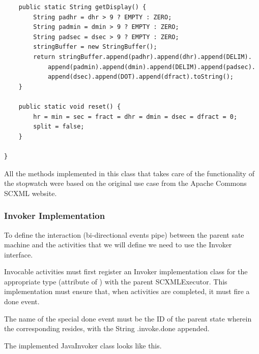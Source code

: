 \documentclass[]{article}
\begin{document}
\begin{lstlisting}
    public static String getDisplay() {
        String padhr = dhr > 9 ? EMPTY : ZERO;
        String padmin = dmin > 9 ? EMPTY : ZERO;
        String padsec = dsec > 9 ? EMPTY : ZERO;
        stringBuffer = new StringBuffer();
        return stringBuffer.append(padhr).append(dhr).append(DELIM).
            append(padmin).append(dmin).append(DELIM).append(padsec).
            append(dsec).append(DOT).append(dfract).toString();
    }

    public static void reset() {
        hr = min = sec = fract = dhr = dmin = dsec = dfract = 0;
        split = false;
    }

}

\end{lstlisting}

All the methods implemented in this class that takes care of the functionality of the stopwatch were based on the original use case from the Apache Commons SCXML website\cite{Apache}. 

\subsubsection{Invoker Implementation}

To define the interaction (bi-directional events pipe) between the parent sate machine and the activities that we will define we need to use the Invoker interface.

Invocable activities must first register an Invoker implementation class for the appropriate \textsf{type} (attribute of ) with the parent SCXMLExecutor. This implementation must ensure that, when activities are completed, it must fire a \textsf{done} event.

The name of the special \textsf{done} event must be the ID of the parent state wherein the corresponding resides, with the String \textsf{.invoke.done} appended. 

The implemented \textsf{JavaInvoker} class looks like this. 
\end{document}
